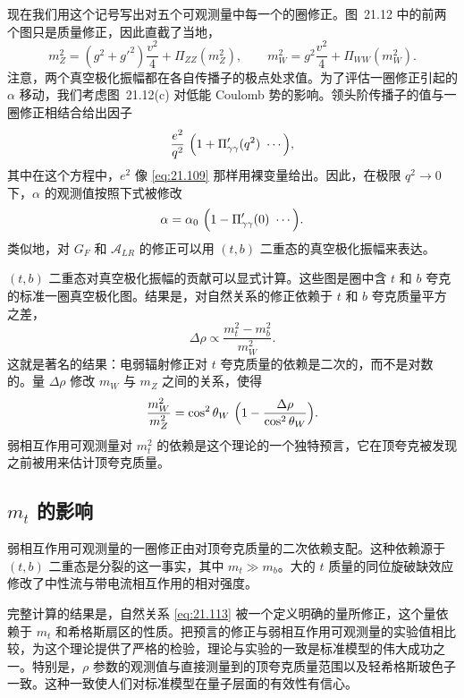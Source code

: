 现在我们用这个记号写出对五个可观测量中每一个的圈修正。图~21.12 中的前两个图只是质量修正，因此直截了当地，
\begin{equation}
  m_Z^2 = (g^2 + g'^2)\frac{v^2}{4} + \Pi_{ZZ}(m_Z^2),\qquad
  m_W^2 = g^2\frac{v^2}{4} + \Pi_{WW}(m_W^2) .
  \label{eq:21.118}
\end{equation}
注意，两个真空极化振幅都在各自传播子的极点处求值。为了评估一圈修正引起的 $\alpha$ 移动，我们考虑图~21.12(c) 对低能 Coulomb 势的影响。领头阶传播子的值与一圈修正相结合给出因子
\begin{equation}
  \frac{e^2}{q^2}\ \Bigl( 1 + \Pi'_{\gamma\gamma}(q^2)\ \cdots \Bigr) ,
  \label{eq:21.119}
\end{equation}
其中在这个方程中，$e^2$ 像 \eqref{eq:21.109} 那样用裸变量给出。因此，在极限 $q^2\to 0$ 下，$\alpha$ 的观测值按照下式被修改
\begin{equation}
  \alpha = \alpha_0\ \Bigl( 1 - \Pi'_{\gamma\gamma}(0)\ \cdots \Bigr) .
  \label{eq:21.120}
\end{equation}
类似地，对 $G_F$ 和 $\mathcal{A}_{LR}$ 的修正可以用 $(t,b)$ 二重态的真空极化振幅来表达。

$(t, b)$ 二重态对真空极化振幅的贡献可以显式计算。这些图是圈中含 $t$ 和 $b$ 夸克的标准一圈真空极化图。结果是，对自然关系的修正依赖于 $t$ 和 $b$ 夸克质量平方之差，
\begin{equation}
  \Delta\rho \propto \frac{m_t^2 - m_b^2}{m_W^2} .
  \label{eq:21.121}
\end{equation}
这就是著名的结果：电弱辐射修正对 $t$ 夸克质量的依赖是二次的，而不是对数的。量 $\Delta\rho$ 修改 $m_W$ 与 $m_Z$ 之间的关系，使得
\begin{equation}
  \frac{m_W^2}{m_Z^2} = \cos^2\theta_W\ \Bigl( 1 - \frac{\Delta\rho}
    {\cos^2\theta_W} \Bigr) .
  \label{eq:21.122}
\end{equation}
弱相互作用可观测量对 $m_t^2$ 的依赖是这个理论的一个独特预言，它在顶夸克被发现之前被用来估计顶夸克质量。

\subsection{$m_t$ 的影响}

弱相互作用可观测量的一圈修正由对顶夸克质量的二次依赖支配。这种依赖源于 $(t, b)$ 二重态是分裂的这一事实，其中 $m_t \gg m_b$。大的 $t$ 质量的同位旋破缺效应修改了中性流与带电流相互作用的相对强度。

完整计算的结果是，自然关系 \eqref{eq:21.113} 被一个定义明确的量所修正，这个量依赖于 $m_t$ 和希格斯扇区的性质。把预言的修正与弱相互作用可观测量的实验值相比较，为这个理论提供了严格的检验，理论与实验的一致是标准模型的伟大成功之一。特别是，$\rho$ 参数的观测值与直接测量到的顶夸克质量范围以及轻希格斯玻色子一致。这种一致使人们对标准模型在量子层面的有效性有信心。

